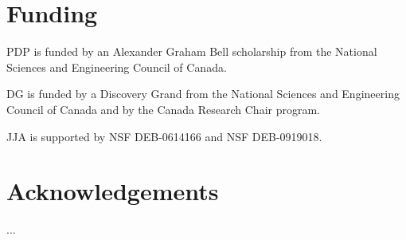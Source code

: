 \documentclass[letterpaper,twocolumn,superscriptaddress,showkeys]{revtex4-1}
\begin{document}
\section{Funding}

PDP is funded by an Alexander Graham Bell scholarship from the National Sciences
and Engineering Council of Canada.

DG is funded by a Discovery Grand from the National Sciences and Engineering
Council of Canada and by the Canada Research Chair program.

JJA is supported by NSF DEB-0614166 and NSF DEB-0919018.

\section{Acknowledgements}

...

\newpage


\end{document}
